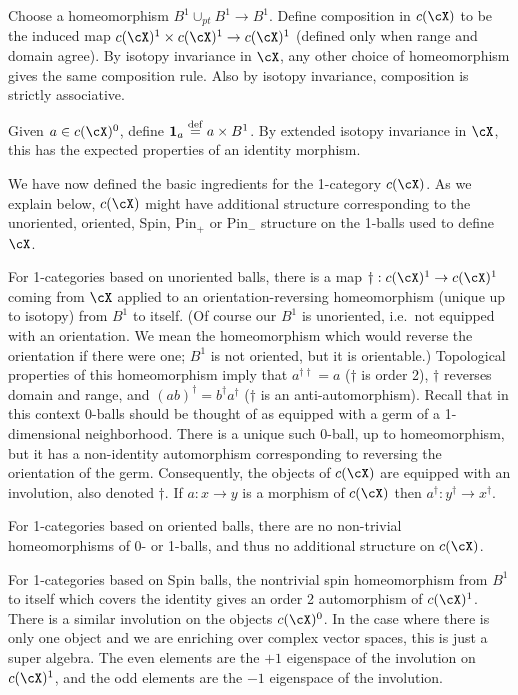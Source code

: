 Choose a homeomorphism $B^1\cup_{pt}B^1 \to B^1$.
Define composition in $c(\cX)$ to be the induced map $c(\cX)^1\times c(\cX)^1 \to c(\cX)^1$ 
(defined only when range and domain agree).
By isotopy invariance in $\cX$, any other choice of homeomorphism gives the same composition rule.
Also by isotopy invariance, composition is strictly associative.

Given $a\in c(\cX)^0$, define $\boldsymbol{1}_a \stackrel{\mathrm{def}}{=} a\times B^1$.
By extended isotopy invariance in $\cX$, this has the expected properties of an identity morphism.

We have now defined the basic ingredients for the 1-category $c(\cX)$.
As we explain below, $c(\cX)$ might have additional structure corresponding to the
unoriented, oriented, Spin, $\text{Pin}_+$ or $\text{Pin}_-$ structure on the 1-balls used to define $\cX$.

For 1-categories based on unoriented balls, 
there is a map $\dagger:c(\cX)^1\to c(\cX)^1$
coming from $\cX$ applied to an orientation-reversing homeomorphism (unique up to isotopy) 
from $B^1$ to itself.
(Of course our $B^1$ is unoriented, i.e.\ not equipped with an orientation.
We mean the homeomorphism which would reverse the orientation if there were one;
$B^1$ is not oriented, but it is orientable.)
Topological properties of this homeomorphism imply that 
$a^{\dagger\dagger} = a$ ($\dagger$ is order 2), $\dagger$ reverses domain and range, and $(ab)^\dagger = b^\dagger a^\dagger$
($\dagger$ is an anti-automorphism).
Recall that in this context 0-balls should be thought of as equipped with a germ of a 1-dimensional neighborhood.
There is a unique such 0-ball, up to homeomorphism, but it has a non-identity automorphism corresponding to reversing the
orientation of the germ.
Consequently, the objects of $c(\cX)$ are equipped with an involution, also denoted $\dagger$.
If $a:x\to y$ is a morphism of $c(\cX)$ then $a^\dagger: y^\dagger\to x^\dagger$.

For 1-categories based on oriented balls, there are no non-trivial homeomorphisms of 0- or 1-balls, and thus no 
additional structure on $c(\cX)$.

For 1-categories based on Spin balls,
the nontrivial spin homeomorphism from $B^1$ to itself which covers the identity
gives an order 2 automorphism of $c(\cX)^1$.
There is a similar involution on the objects $c(\cX)^0$.
In the case where there is only one object and we are enriching over complex vector spaces, this
is just a super algebra.
The even elements are the $+1$ eigenspace of the involution on $c(\cX)^1$, 
and the odd elements are the $-1$ eigenspace of the involution.

